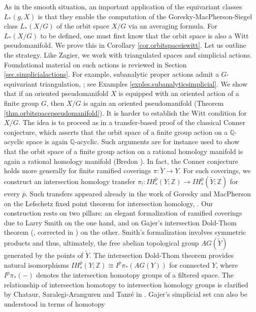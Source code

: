 \documentclass{amsart}
\theoremstyle{definition}
\theoremstyle{remark}
\newcommand {\intg}  {\ensuremath{\mathbb{Z}}}
\newcommand {\rat}   {\ensuremath{\mathbb{Q}}}
\newcommand {\bp}    {{\ensuremath{\bar{p}}}}
\newcommand {\wY}    {{\ensuremath{\widetilde{Y}}}}
\begin{document}
As in the smooth situation, an important application of the equivariant
classes $L_* (g,X)$ is that they enable the computation of the 
Goresky-MacPherson-Siegel class $L_* (X/G)$ of the orbit space $X/G$ via an
averaging formula. For $L_* (X/G)$ to be defined, one must first know
that the orbit space is also a Witt pseudomanifold.
We prove this in Corollary \ref{cor.orbitspaceiswitt}. Let us outline the strategy.
Like Zagier, we work with triangulated spaces and simplicial actions.
Foundational material on such actions is reviewed in Section \ref{sec.simplicialactions}.
For example, subanalytic proper actions admit a $G$-equivariant triangulation,
\cite[Prop. 6.7]{blp}; see Examples \ref{exples.subanalyticsimplicial}.
We show that if an oriented pseudomanifold $X$ is equipped with an oriented action
of a finite group $G$, then $X/G$ is again an oriented pseudomanifold
(Theorem \ref{thm.orbitspacepseudomanifold}).
It is harder to establish the Witt condition for $X/G$.
The idea is to proceed as in a transfer-based proof of the classical
Conner conjecture, which asserts that the orbit space
of a finite group action on a $\rat$-acyclic space is again
$\rat$-acyclic. Such arguments are for instance used to show
that the orbit space of a finite group action on a rational homology manifold
is again a rational homology manifold (Bredon \cite[V \S 19]{bredonsheaftheory}).
In fact, the Conner conjecture holds more generally
for finite ramified coverings $\pi: \wY \to Y$.
For such coverings, we construct an intersection homology transfer
$\pi_!: IH^\bp_* (Y;\intg) \to IH^\bp_* (\widetilde{Y}; \intg)$
for every $\bp$.
Such transfers appeared already in the work of Goresky and MacPherson
on the Lefschetz fixed point theorem for intersection homology, \cite{gmlefschetz}.
Our construction rests on two pillars:
an elegant formalization of ramified coverings
due to Larry Smith \cite{smithlarry} on the one hand, and on
Gajer's intersection Dold-Thom theorem (\cite{gajer}, corrected in \cite{gajercorrection})
on the other.
Smith's formalization involves symmetric products and thus, ultimately,
the free abelian topological group $AG(\wY)$ generated by the points
of $\wY$.
The intersection Dold-Thom theorem provides natural isomorphisms
$IH^\bp_* (Y;\intg) \cong I^\bp \pi_* (AG(Y))$
for connected $Y$, where
$I^\bp \pi_* (-)$ denotes the intersection homotopy groups
of a filtered space. The relationship of intersection homotopy to 
intersection homology groups
is clarified by Chataur, Saralegi-Aranguren and Tanr\'e in \cite{chataurst}.
Gajer's simplicial set can also be understood in terms of homotopy
\end{document}

